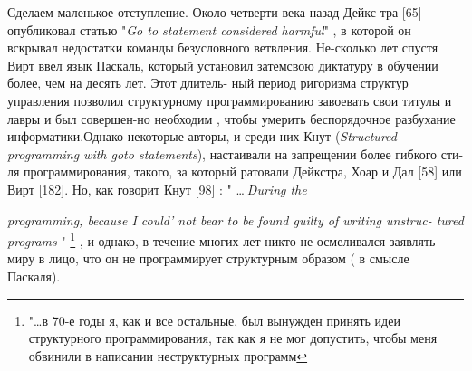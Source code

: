 Сделаем маленькое отступление. Около четверти века назад Дейкс-\linebreak тра [65] опубликовал статью "\textit{Go to statement considered harmful}" , в \linebreak которой он вскрывал недостатки команды безусловного ветвления. Не-\linebreak сколько лет спустя Вирт ввел язык Паскаль, который установил затем\linebreak свою диктатуру в обучении более, чем на десять лет. Этот длитель- \linebreak ный период ригоризма структур управления позволил структурному \linebreak программированию завоевать свои титулы и лавры и был совершен-\linebreak но необходим , чтобы умерить беспорядочное разбухание информатики.\linebreak Однако некоторые авторы, и среди них Кнут (\textit{Structured programming \linebreak  with goto statements}), настаивали на запрещении более гибкого сти-\linebreak ля программирования, такого, за который ратовали Дейкстра, Хоар \linebreak и Дал [58]\: или\:\: Вирт [182]\:. Но,\: как\: говорит\:\: Кнут [98]\: :  " \dots$~$\textit{During\: the}

\pagebreak

\noindent\textit{programming, because I could' not bear to be found guilty of writing unstruc-\linebreak
tured programs }" \footnote[2]{"\dots в 70-е годы я, как и все остальные, был вынужден принять идеи структурного программирования, так как я не мог допустить, чтобы меня обвинили в написании неструктурных программ} , и однако, в течение многих лет никто не осмеливался заявлять миру в лицо, что он не программирует структурным образом ( в смысле Паскаля). 

